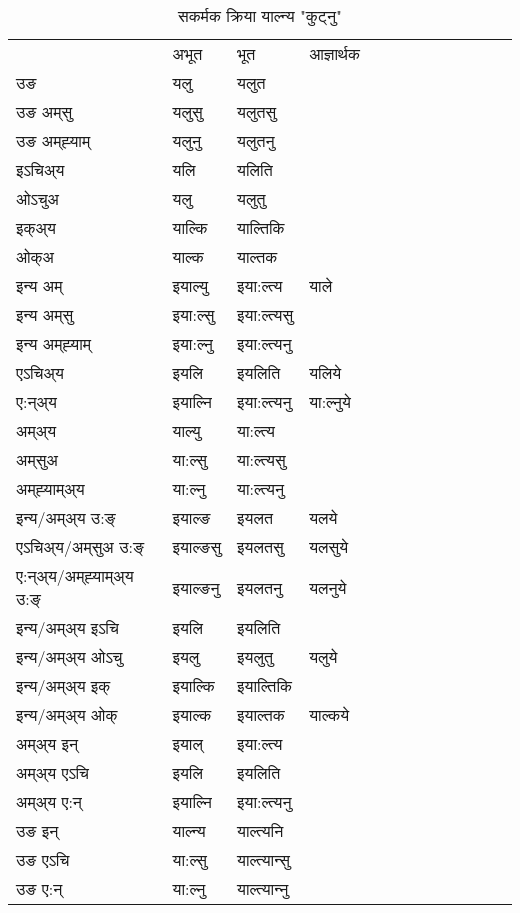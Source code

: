 \begin{table}[H]
\centering
\caption{\label{al.vt} सकर्मक क्रिया  याल्न्य  "कुट्नु"  }
\begin{tabular}{l|l|l|l|l|l|l|l|l|l|l|l|l}  \toprule
&अभूत & भूत & आज्ञार्थक \\ 
उङ &यलु &यलुत \\ 
उङ अम्‌सु &यलुसु &यलुतसु \\ 
उङ अम्‌ह्‍याम् &यलुनु &यलुतनु \\ 
इऽचिअ्य &यलि &यलिति   \\ 
ओऽचुअ &यलु &यलुतु   \\ 
इक्अ्य &याल्कि &याल्तिकि   \\ 
ओक्अ &याल्क &याल्तक   \\ 
इन्य अम् & इयाल्यु  & इया:ल्त्य &याले  \\ 
इन्य अम्‌सु & इया:ल्सु  & इया:ल्त्यसु   \\ 
इन्य अम्‌ह्‍याम् & इया:ल्नु  & इया:ल्त्यनु   \\ 
एऽचिअ्य & इयलि & इयलिति &यलिये    \\ 
ए:न्अ्य & इयाल्नि  & इया:ल्त्यनु &या:ल्नुये  \\ 
अम्अ्य & याल्यु  & या:ल्त्य  \\ 
अम्‌सुअ & या:ल्सु & या:ल्त्यसु  \\ 
अम्‌ह्‍याम्अ्य & या:ल्नु  & या:ल्त्यनु \\ 
\midrule
इन्य/अम्अ्य उ:ङ्‌&इयाल्ङ & इयलत &यलये \\ 
एऽचिअ्य/अम्‌सुअ उ:ङ्‌ &इयाल्ङसु & इयलतसु &यलसुये \\ 
ए:न्अ्य/अम्‌ह्‍याम्अ्य उ:ङ्‌ &इयाल्ङनु & इयलतनु &यलनुये \\ 
इन्य/अम्अ्य इऽचि & इयलि & इयलिति    \\ 
इन्य/अम्अ्य ओऽचु & इयलु & इयलुतु  &यलुये  \\ 
इन्य/अम्अ्य इक् & इयाल्कि & इयाल्तिकि   \\ 
इन्य/अम्अ्य ओक् & इयाल्क & इयाल्तक  &याल्कये  \\ 
अम्अ्य इन् & इयाल् & इया:ल्त्य   \\ 
अम्अ्य एऽचि & इयलि & इयलिति    \\ 
अम्अ्य ए:न् & इयाल्नि  & इया:ल्त्यनु  \\ 
\midrule
उङ इन् & याल्न्य  & याल्त्यनि  \\ 
उङ एऽचि & या:ल्सु  & याल्त्यान्सु   \\ 
उङ ए:न्& या:ल्नु  & याल्त्यान्‍नु   \\ 
\bottomrule
\end{tabular}
\end{table}


